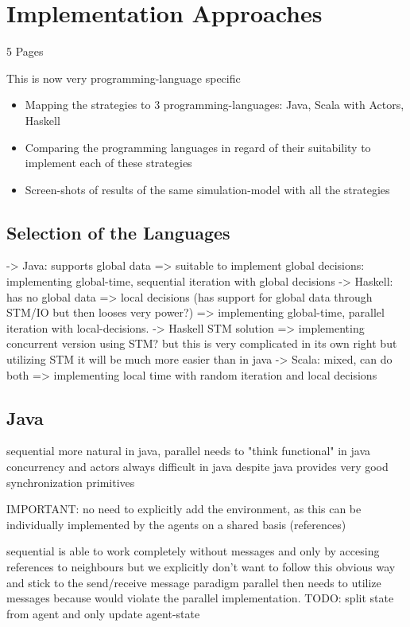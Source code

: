 \section{Implementation Approaches}
5 Pages

This is now very programming-language specific

\begin{itemize}
	\item Mapping the strategies to 3 programming-languages: Java, Scala with Actors, Haskell
	\item Comparing the programming languages in regard of their suitability to implement each of these strategies
	\item Screen-shots of results of the same simulation-model with all the strategies
\end{itemize}

\subsection{Selection of the Languages}
-> Java: supports global data => suitable to implement global decisions: implementing global-time, sequential iteration with global decisions
	-> Haskell: has no global data => local decisions (has support for global data through STM/IO but then looses very power?) => implementing global-time, parallel iteration with local-decisions. 
		-> Haskell STM solution => implementing concurrent version using STM? but this is very complicated in its own right but utilizing STM it will be much more easier than in java
	-> Scala: mixed, can do both => implementing local time with random iteration and local decisions


\subsection{Java}
sequential more natural in java,
parallel needs to "think functional" in java
concurrency and actors always difficult in java despite java provides very good synchronization primitives

IMPORTANT: no need to explicitly add the environment, as this can be individually implemented by the agents on a shared basis (references)

sequential is able to work completely without messages and only by accesing references to neighbours but we explicitly don't want to follow this obvious way and stick to the send/receive message paradigm
parallel then needs to utilize messages because would violate the parallel implementation. TODO: split state from agent and only update agent-state

